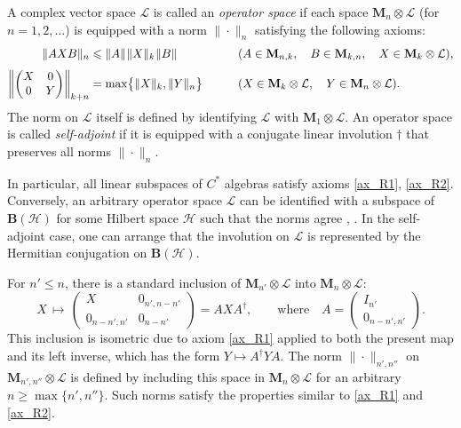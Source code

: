 \documentclass[12pt]{article}
\newcommand{\calH}{\mathcal{H}}
\newcommand{\calL}{\mathcal{L}}
\newcommand{\ts}{\mkern1mu}
\newcommand{\Bo}{\mathbf{B}}
\newcommand*{\Ma}[1]{\mathbf{M}_{#1}}
\renewcommand{\le}{\leqslant}
\renewcommand{\ge}{\geqslant}
\newtheorem[definition]{Definition}[Theorem]{Definition}
\newtheorem[remark]{Example}[Theorem]{Example}
\newtheorem[remark]{Remark}[Theorem]{Remark}
\newtheorem[remark]{Question}[Theorem]{Open question}
\newtheorem*[definition]{definition}{Definition}
\newtheorem*[remark]{example}{Example}
\newtheorem*[remark]{remark}{Remark}
\newtheorem*[remark]{question}{Open question}
\numberwithin{equation}{section}
\begin{document}
\begin{Definition}\label{def:opspace}
A complex vector space $\calL$ is called an \emph{operator space} if each space $\Ma{n}\otimes\calL$ (for $n=1,2,\ldots$) is equipped with a norm $\|\cdot\|_n$ satisfying the following axioms:
\begin{alignat}{2}
\label{ax_R1}
\|AXB\|_n &\le\|A\|\ts\|X\|_k\ts\|B\|\qquad &
&(A\in\Ma{n,k},\quad B\in\Ma{k,n},\quad X\in\Ma{k}\otimes\calL),\\[3pt]
\label{ax_R2}
\left\|\begin{pmatrix}X&0\\ 0&Y\end{pmatrix}\right\|_{k+n} &=\max\bigl\{\|X\|_k,\|Y\|_n\bigr\}\qquad &
& (X\in\Ma{k}\otimes\calL,\quad Y\in\Ma{n}\otimes\calL).
\end{alignat}
The norm on $\calL$ itself is defined by identifying $\calL$ with $\Ma{1}\otimes\calL$. An operator space is called \emph{self-adjoint} if it is equipped with a conjugate linear involution $\dagger$ that preserves all norms $\|\cdot\|_n$.
\end{Definition}
In particular, all linear subspaces of $C^*$ algebras satisfy axioms \eqref{ax_R1}, \eqref{ax_R2}. Conversely, an arbitrary operator space $\calL$ can be identified with a subspace of $\Bo(\calH)$ for some Hilbert space $\calH$ such that the norms agree \cite{Rua88}, \cite[Theorem~13.4]{Paulsen}. In the self-adjoint case, one can arrange that the involution on $\calL$ is represented by the Hermitian conjugation on $\Bo(\calH)$.\smallskip

For $n'\le n$, there is a standard inclusion of $\Ma{n'}\otimes\calL$ into $\Ma{n}\otimes\calL$:
\begin{equation}
X\,\mapsto\,\begin{pmatrix}X & 0_{n',n-n'}\\ 0_{n-n',n'} & 0_{n-n'}\end{pmatrix}
=AXA^\dag,\qquad \text{where}\quad
A=\begin{pmatrix}I_{n'}\\ 0_{n-n',n'}\end{pmatrix}.
\end{equation}
This inclusion is isometric due to axiom \eqref{ax_R1} applied to both the present map and its left inverse, which has the form $Y\mapsto A^{\dag}YA$. The norm $\|\cdot\|_{n',n''}$ on $\Ma{n',n''}\otimes\calL$ is defined by including this space in $\Ma{n}\otimes\calL$ for an arbitrary $n\ge\max\{n',n''\}$. Such norms satisfy the properties similar to \eqref{ax_R1} and \eqref{ax_R2}.
\end{document}
